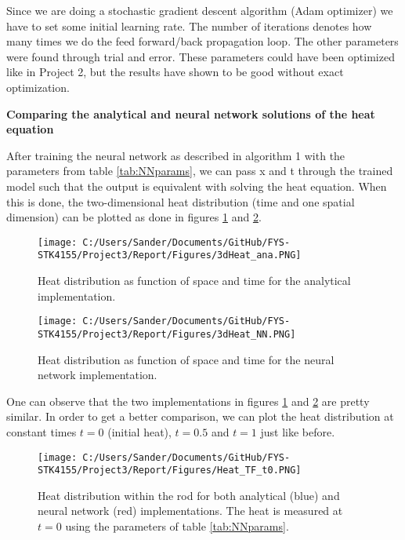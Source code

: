 \documentclass[12pt,a4paper]{article}
\begin{document}
\noindent Since we are doing a stochastic gradient descent algorithm (Adam optimizer) we have to set some initial learning rate. The number of iterations denotes how many times we do the feed forward/back propagation loop. The other parameters were found through trial and error. These parameters could have been optimized like in Project 2, but the results have shown to be good without exact optimization.

\begin{center}
\large{\textbf{Comparing the analytical and neural network solutions of the heat equation}}
\end{center}

\noindent After training the neural network as described in algorithm 1 with the parameters from table \ref{tab:NNparams}, we can pass x and t through the trained model such that the output is equivalent with solving the heat equation. When this is done, the two-dimensional heat distribution (time and one spatial dimension) can be plotted as done in figures \ref{fig:3dHeatAna} and \ref{fig:3dHeatNN}.

\begin{figure}[H]
\centering
\texttt{[image: C:/Users/Sander/Documents/GitHub/FYS-STK4155/Project3/Report/Figures/3dHeat\_ana.PNG]}
\caption{\label{fig:3dHeatAna} Heat distribution as function of space and time for the analytical implementation.}
\end{figure}

\begin{figure}[H]
\centering
\texttt{[image: C:/Users/Sander/Documents/GitHub/FYS-STK4155/Project3/Report/Figures/3dHeat\_NN.PNG]}
\caption{\label{fig:3dHeatNN} Heat distribution as function of space and time for the neural network implementation.}
\end{figure}

\noindent One can observe that the two implementations in figures \ref{fig:3dHeatAna} and \ref{fig:3dHeatNN} are pretty similar. In order to get a better comparison, we can plot the heat distribution at constant times $t = 0$ (initial heat), $t = 0.5$ and $t = 1$ just like before.

\begin{figure}[H]
\centering
\texttt{[image: C:/Users/Sander/Documents/GitHub/FYS-STK4155/Project3/Report/Figures/Heat\_TF\_t0.PNG]}
\caption{\label{fig:rodHeatTF0} Heat distribution within the rod for both analytical (blue) and neural network (red) implementations. The heat is measured at $t = 0$ using the parameters of table \ref{tab:NNparams}.}
\end{figure}
\end{document}
